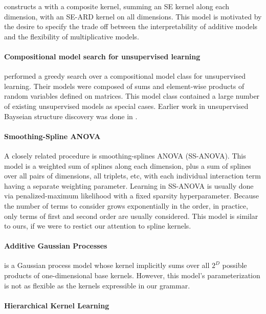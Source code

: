\documentclass[twoside]{article}
\begin{document}
\cite{plate1999accuracy} constructs a \gp{} with a composite kernel, summing an SE kernel along each dimension, with an SE-ARD kernel on all dimensions.  This model is motivated by the desire to specify the trade off between the interpretability of additive models and the flexibility of multiplicative models.

\paragraph{Compositional model search for unsupervised learning} \cite{grosse2012exploiting} performed a greedy search over a compositional model class for unsupervised learning.  Their models were composed of sums and element-wise products of random variables defined on matrices.  This model class contained a large number of existing unsupervised models as special cases.  Earlier work in unsupervised Bayseian structure discovery was done in \cite{kemp2008discovery}.

\paragraph{Smoothing-Spline ANOVA}  A closely related procedure is smoothing-splines ANOVA (SS-ANOVA)\cite{wahba1990spline, gu2002smoothing}.
This model is a weighted sum of splines along each dimension, plus a sum of splines over all pairs of dimensions, all triplets, etc, with each individual interaction term having a separate weighting parameter.
Learning in SS-ANOVA is usually done via penalized-maximum likelihood with a fixed sparsity hyperparameter.
Because the number of terms to consider grows exponentially in the order, in practice, only terms of first and second order are usually considered.
This model is similar to ours, if we were to restict our attention to spline kernels.

\paragraph{Additive Gaussian Processes} \cite{duvenaud2011additive11} is a Gaussian process model whose kernel implicitly sums over all $2^D$ possible products of one-dimensional base kernels.  
However, this model's parameterization is not as flexible as the kernels expressible in our grammar.

\paragraph{Hierarchical Kernel Learning}
\end{document}
